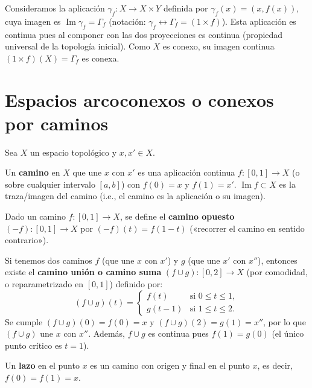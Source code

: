 \begin{dem}
Consideramos la aplicación $\gamma_f \colon X \to X \times Y$ definida por $\gamma_f(x) = (x, f(x))$, cuya imagen es $\operatorname{Im} \gamma_f = \Gamma_f$ (notación: $\gamma_f \leftrightarrow \Gamma_f = (1 \times f)$). Esta aplicación es continua pues al componer con las dos proyecciones es continua (propiedad universal de la topología inicial). Como $X$ es conexo, su imagen continua $(1 \times f)(X) = \Gamma_f$ es conexa.
\end{dem}

\section{Espacios arcoconexos o conexos por caminos}

Sea $X$ un espacio topológico y $x, x' \in X$.

\begin{defi}
Un \textbf{camino} en $X$ que une $x$ con $x'$ es una aplicación continua $f \colon [0,1] \to X$ (o sobre cualquier intervalo $[a,b]$) con $f(0) = x$ y $f(1) = x'$. $\operatorname{Im} f \subset X$ es la traza/imagen del camino (i.e., el camino es la aplicación o su imagen).
\end{defi}

\begin{defi}
Dado un camino $f \colon [0,1] \to X$, se define el \textbf{camino opuesto} $(-f) \colon [0,1] \to X$ por $(-f)(t) = f(1-t)$ («recorrer el camino en sentido contrario»).
\end{defi}

\begin{propi}
Si tenemos dos caminos $f$ (que une $x$ con $x'$) y $g$ (que une $x'$ con $x''$), entonces existe el \textbf{camino unión o camino suma} $(f \cup g) \colon [0,2] \to X$ (por comodidad, o reparametrizado en $[0,1]$) definido por:
\[
(f \cup g)(t) = \begin{cases}
f(t) & \text{si } 0 \le t \le 1, \\
g(t-1) & \text{si } 1 \le t \le 2.
\end{cases}
\]
Se cumple $(f \cup g)(0) = f(0) = x$ y $(f \cup g)(2) = g(1) = x''$, por lo que $(f \cup g)$ une $x$ con $x''$. Además, $f \cup g$ es continua pues $f(1) = g(0)$ (el único punto crítico es $t = 1$).
\end{propi}
\begin{defi}
Un \textbf{lazo} en el punto $x$ es un camino con origen y final en el punto $x$, es decir, $f(0) = f(1) = x$.

\begin{center}
\end{center}
\end{defi}

